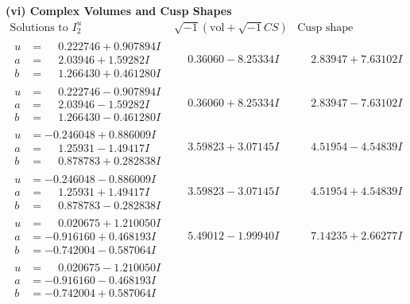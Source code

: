 \documentclass[1p]{elsarticle_modified}
\theoremstyle{definition}
\newcommand{\I}{\sqrt{-1}}
\begin{document}
\newpage\flushleft \textbf{(vi) Complex Volumes and Cusp Shapes}
$$\begin{array}{c|c|c}  
\text{Solutions to }I^u_{2}& \I (\text{vol} + \sqrt{-1}CS) & \text{Cusp shape}\\
 \hline 
\begin{aligned}
u &= \phantom{-}0.222746 + 0.907894 I \\
a &= \phantom{-}2.03946 + 1.59282 I \\
b &= \phantom{-}1.266430 + 0.461280 I\end{aligned}
 & \phantom{-}0.36060 - 8.25334 I & \phantom{-}2.83947 + 7.63102 I \\ \hline\begin{aligned}
u &= \phantom{-}0.222746 - 0.907894 I \\
a &= \phantom{-}2.03946 - 1.59282 I \\
b &= \phantom{-}1.266430 - 0.461280 I\end{aligned}
 & \phantom{-}0.36060 + 8.25334 I & \phantom{-}2.83947 - 7.63102 I \\ \hline\begin{aligned}
u &= -0.246048 + 0.886009 I \\
a &= \phantom{-}1.25931 - 1.49417 I \\
b &= \phantom{-}0.878783 + 0.282838 I\end{aligned}
 & \phantom{-}3.59823 + 3.07145 I & \phantom{-}4.51954 - 4.54839 I \\ \hline\begin{aligned}
u &= -0.246048 - 0.886009 I \\
a &= \phantom{-}1.25931 + 1.49417 I \\
b &= \phantom{-}0.878783 - 0.282838 I\end{aligned}
 & \phantom{-}3.59823 - 3.07145 I & \phantom{-}4.51954 + 4.54839 I \\ \hline\begin{aligned}
u &= \phantom{-}0.020675 + 1.210050 I \\
a &= -0.916160 + 0.468193 I \\
b &= -0.742004 - 0.587064 I\end{aligned}
 & \phantom{-}5.49012 - 1.99940 I & \phantom{-}7.14235 + 2.66277 I \\ \hline\begin{aligned}
u &= \phantom{-}0.020675 - 1.210050 I \\
a &= -0.916160 - 0.468193 I \\
b &= -0.742004 + 0.587064 I\end{aligned}

\end{array}$$
\end{document}

